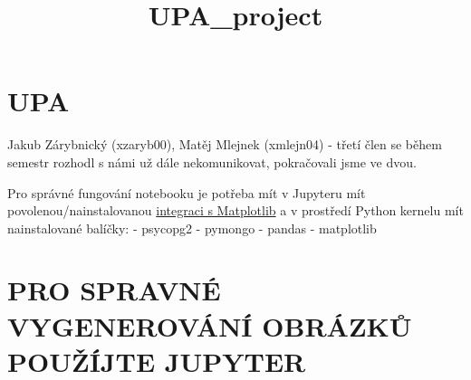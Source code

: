 \documentclass[11pt]{article}
\title{UPA\_project}
\begin{document}
    
    \maketitle
    
    

    
    \hypertarget{upa}{%
\section{UPA}\label{upa}}

Jakub Zárybnický (xzaryb00), Matěj Mlejnek (xmlejn04) - třetí člen se
během semestr rozhodl s námi už dále nekomunikovat, pokračovali jsme ve
dvou.

Pro správné fungování notebooku je potřeba mít v Jupyteru mít
povolenou/nainstalovanou
\href{https://github.com/matplotlib/ipympl}{integraci s Matplotlib} a v
prostředí Python kernelu mít nainstalované balíčky: - psycopg2 - pymongo
- pandas - matplotlib

    \hypertarget{pro-spravnuxe9-vygenerovuxe1nuxed-obruxe1zkux16f-pouux17euxedjte-jupyter}{%
\section{PRO SPRAVNÉ VYGENEROVÁNÍ OBRÁZKŮ POUŽÍJTE
JUPYTER}\label{pro-spravnuxe9-vygenerovuxe1nuxed-obruxe1zkux16f-pouux17euxedjte-jupyter}}
\end{document}
